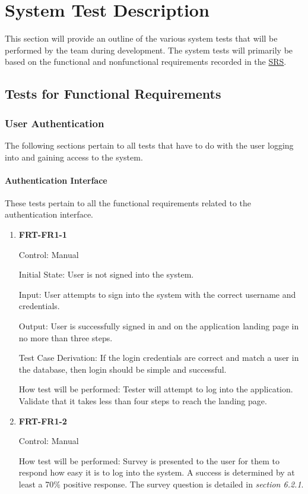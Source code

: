 \documentclass[12pt, titlepage]{article}
\begin{document}
\section{System Test Description}

This section will provide an outline of the various system tests that will be performed
by the team during development. The system tests will primarily be based on the functional and nonfunctional requirements
recorded in the \href{https://github.com/r-yeh/grocery-spending-tracker/blob/master/docs/SRS/SRS.pdf}{SRS}.
	
\subsection{Tests for Functional Requirements}

\subsubsection{User Authentication}

The following sections pertain to all tests that have to do with the user logging into and gaining access to the system.

\paragraph{Authentication Interface}

These tests pertain to all the functional requirements related to the authentication interface.

\begin{enumerate}

\item{\textbf{FRT-FR1-1}}

Control: Manual
          
Initial State: User is not signed into the system.
          
Input: User attempts to sign into the system with the correct username and credentials.

Output: User is successfully signed in and on the application landing page in no more than three steps.

Test Case Derivation: If the login credentials are correct and match a user in the database, then login should be simple and successful.
          
How test will be performed: Tester will attempt to log into the application. Validate that it takes less than four steps to reach the landing page.

\item{\textbf{FRT-FR1-2}}

Control: Manual
          
How test will be performed: Survey is presented to the user for them to respond how easy it is to log into the system.
A success is determined by at least a 70\% positive response. The survey question is detailed in \textit{section 6.2.1}.

\end{enumerate}
\end{document}
